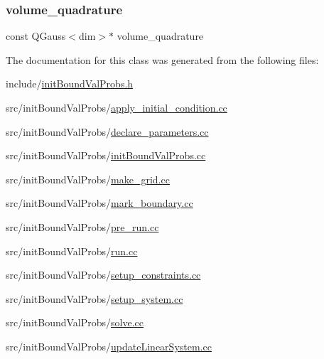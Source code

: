 \mbox{\label{classinit_bound_val_probs_a7e2363a91f6f1626f463f3a06108c03b}} 
\subsubsection{\texorpdfstring{volume\_quadrature}{volume\_quadrature}}
{\footnotesize\ttfamily const Q\+Gauss$<$dim$>$$\ast$ volume\+\_\+quadrature}



The documentation for this class was generated from the following files\+:\begin{DoxyCompactItemize}
\item 
include/\mbox{\hyperlink{init_bound_val_probs_8h}{init\+Bound\+Val\+Probs.\+h}}\item 
src/init\+Bound\+Val\+Probs/\mbox{\hyperlink{apply__initial__condition_8cc}{apply\+\_\+initial\+\_\+condition.\+cc}}\item 
src/init\+Bound\+Val\+Probs/\mbox{\hyperlink{init_bound_val_probs_2declare__parameters_8cc}{declare\+\_\+parameters.\+cc}}\item 
src/init\+Bound\+Val\+Probs/\mbox{\hyperlink{init_bound_val_probs_8cc}{init\+Bound\+Val\+Probs.\+cc}}\item 
src/init\+Bound\+Val\+Probs/\mbox{\hyperlink{make__grid_8cc}{make\+\_\+grid.\+cc}}\item 
src/init\+Bound\+Val\+Probs/\mbox{\hyperlink{mark__boundary_8cc}{mark\+\_\+boundary.\+cc}}\item 
src/init\+Bound\+Val\+Probs/\mbox{\hyperlink{pre__run_8cc}{pre\+\_\+run.\+cc}}\item 
src/init\+Bound\+Val\+Probs/\mbox{\hyperlink{run_8cc}{run.\+cc}}\item 
src/init\+Bound\+Val\+Probs/\mbox{\hyperlink{setup__constraints_8cc}{setup\+\_\+constraints.\+cc}}\item 
src/init\+Bound\+Val\+Probs/\mbox{\hyperlink{setup__system_8cc}{setup\+\_\+system.\+cc}}\item 
src/init\+Bound\+Val\+Probs/\mbox{\hyperlink{solve_8cc}{solve.\+cc}}\item 
src/init\+Bound\+Val\+Probs/\mbox{\hyperlink{update_linear_system_8cc}{update\+Linear\+System.\+cc}}\end{DoxyCompactItemize}
